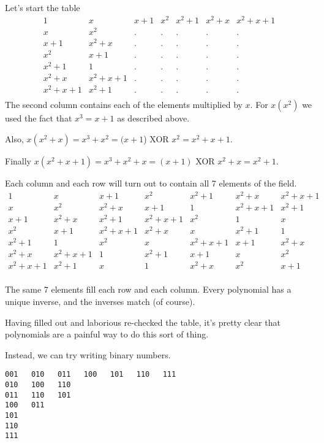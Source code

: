 \documentclass[11pt, oneside]{article}
\begin{document}
Let's start the table
\[ 
\begin{matrix}
1 & x & x + 1 & x^2 & x^2 + 1 & x^2 + x & x^2 + x + 1 \\
x & x^2 & . & . & . &.  & . \\
x + 1 & x^2 + x & . & . & . & . & . \\
x^2 & x + 1  & . & . & . & . & . \\
x^2 + 1 & 1  & . & . & . & . & . \\
x^2 + x & x^2 + x + 1   & . & . & . & . & . \\
x^2 + x + 1 & x^2 + 1 & . & . & . & . & . \\
\end{matrix} 
\]
The second column contains each of the elements multiplied by $x$.  For $x(x^2)$ we used the fact that $x^3 = x + 1$ as described above.

Also, $x(x^2 + x) = x^3 + x^2 = (x + 1$) XOR $x^2 = x^2 + x + 1$.  

Finally $x(x^2 + x + 1) = x^3 + x^2 + x = (x + 1) $ XOR $x^2 + x = x^2 + 1$.

Each column and each row will turn out to contain all 7 elements of the field.  
\[ 
\begin{matrix}
1 & x & x + 1 & x^2 & x^2 + 1 & x^2 + x & x^2 + x + 1 \\
x & x^2 & x^2 + x & x + 1 & 1 & x^2 + x + 1  & x^2 + 1 \\
x + 1 & x^2 + x & x^2 + 1 & x^2 + x + 1 & x^2 & 1 & x \\
x^2 & x + 1  & x^2 + x + 1 & x^2 + x & x & x^2 + 1 & 1 \\
x^2 + 1 & 1  & x^2 & x & x^2 + x + 1 & x + 1 & x^2 + x \\
x^2 + x & x^2 + x + 1   & 1 & x^2 + 1& x + 1 & x & x^2 \\
x^2 + x + 1 & x^2 + 1 & x & 1 & x^2 + x & x^2 & x + 1 \\
\end{matrix} 
\]

The same 7 elements fill each row and each column.  Every polynomial has a unique inverse, and the inverses match (of course).

Having filled out and laborious re-checked the table, it's pretty clear that polynomials are a painful way to do this sort of thing.

Instead, we can try writing binary numbers.
\newpage
\begin{verbatim}
001   010   011   100   101   110   111
010   100   110
011   110   101
100   011
101
110
111
\end{verbatim} 
\end{document}
